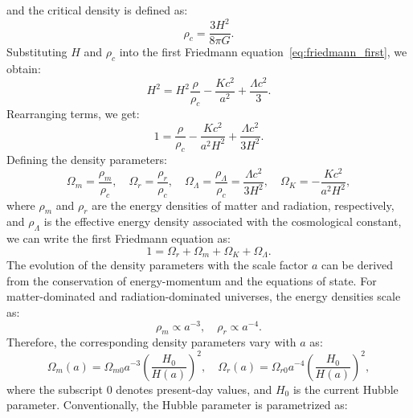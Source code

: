 and the critical density is defined as:
\begin{equation}
    \rho_c = \frac{3 H^2}{8\pi G}.
    \label{eq:critical_density}
\end{equation}
Substituting \( H \) and \( \rho_c \) into the first Friedmann equation~\eqref{eq:friedmann_first}, we obtain:
\begin{equation}
    H^2 = H^2 \frac{\rho}{\rho_c} - \frac{K c^2}{a^2} + \frac{\Lambda c^2}{3}.
    \label{eq:friedmann_with_critical_density}
\end{equation}
Rearranging terms, we get:
\begin{equation}
    1 = \frac{\rho}{\rho_c} - \frac{K c^2}{a^2 H^2} + \frac{\Lambda c^2}{3 H^2}.
    \label{eq:friedmann_normalized}
\end{equation}
Defining the density parameters:
\begin{equation}
    \Omega_m = \frac{\rho_m}{\rho_c}, \quad \Omega_r = \frac{\rho_r}{\rho_c}, \quad \Omega_\Lambda = \frac{\rho_\Lambda}{\rho_c} = \frac{\Lambda c^2}{3 H^2}, \quad \Omega_K = -\frac{K c^2}{a^2 H^2},
    \label{eq:density_parameters}
\end{equation}
where \( \rho_m \) and \( \rho_r \) are the energy densities of matter and radiation, respectively, and \( \rho_\Lambda \) is the effective energy density associated with the cosmological constant, we can write the first Friedmann equation as:
\begin{equation}
    1 = \Omega_r + \Omega_m + \Omega_K + \Omega_\Lambda.
    \label{eq:friedmann_density_parameters}
\end{equation}
The evolution of the density parameters with the scale factor \( a \) can be derived from the conservation of energy-momentum and the equations of state. For matter-dominated and radiation-dominated universes, the energy densities scale as:
\begin{equation}
    \rho_m \propto a^{-3}, \quad \rho_r \propto a^{-4}.
    \label{eq:energy_density_scaling}
\end{equation}
Therefore, the corresponding density parameters vary with \( a \) as:
\begin{equation}
    \Omega_m(a) = \Omega_{m0} a^{-3} \left( \frac{H_0}{H(a)} \right)^2, \quad \Omega_r(a) = \Omega_{r0} a^{-4} \left( \frac{H_0}{H(a)} \right)^2,
    \label{eq:density_parameters_evolution}
\end{equation}
where the subscript \( 0 \) denotes present-day values, and \( H_0 \) is the current Hubble parameter. Conventionally, the Hubble parameter is parametrized as:

